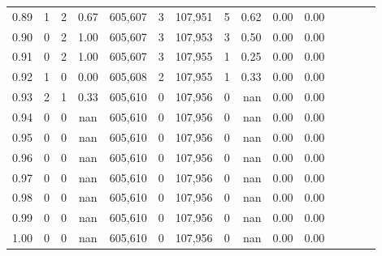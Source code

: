 \begin{tabular}{rrrcrrrrrrrrrrr}
0.89 &       1 &      2 &                                       0.67 &  605,607 &        3 &  107,951 &        5 &  0.62 &  0.00 &                         0.00 \\
0.90 &       0 &      2 &                                       1.00 &  605,607 &        3 &  107,953 &        3 &  0.50 &  0.00 &                         0.00 \\
0.91 &       0 &      2 &                                       1.00 &  605,607 &        3 &  107,955 &        1 &  0.25 &  0.00 &                         0.00 \\
0.92 &       1 &      0 &                                       0.00 &  605,608 &        2 &  107,955 &        1 &  0.33 &  0.00 &                         0.00 \\
0.93 &       2 &      1 &                                       0.33 &  605,610 &        0 &  107,956 &        0 &   nan &  0.00 &                         0.00 \\
0.94 &       0 &      0 &                                        nan &  605,610 &        0 &  107,956 &        0 &   nan &  0.00 &                         0.00 \\
0.95 &       0 &      0 &                                        nan &  605,610 &        0 &  107,956 &        0 &   nan &  0.00 &                         0.00 \\
0.96 &       0 &      0 &                                        nan &  605,610 &        0 &  107,956 &        0 &   nan &  0.00 &                         0.00 \\
0.97 &       0 &      0 &                                        nan &  605,610 &        0 &  107,956 &        0 &   nan &  0.00 &                         0.00 \\
0.98 &       0 &      0 &                                        nan &  605,610 &        0 &  107,956 &        0 &   nan &  0.00 &                         0.00 \\
0.99 &       0 &      0 &                                        nan &  605,610 &        0 &  107,956 &        0 &   nan &  0.00 &                         0.00 \\
1.00 &       0 &      0 &                                        nan &  605,610 &        0 &  107,956 &        0 &   nan &  0.00 &                         0.00 \\
\bottomrule
\end{tabular}
